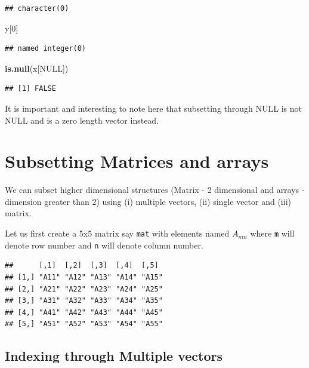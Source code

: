 \documentclass[
]{book}
\newenvironment{Shaded}{\begin{snugshade}}{\end{snugshade}}
\newcommand{\ConstantTok}[1]{\textcolor[rgb]{0.56,0.35,0.01}{#1}}
\newcommand{\DecValTok}[1]{\textcolor[rgb]{0.00,0.00,0.81}{#1}}
\newcommand{\FunctionTok}[1]{\textcolor[rgb]{0.13,0.29,0.53}{\textbf{#1}}}
\newcommand{\NormalTok}[1]{#1}
\begin{document}
\begin{verbatim}
## character(0)
\end{verbatim}

\begin{Shaded}
\begin{Highlighting}[]
\NormalTok{y[}\DecValTok{0}\NormalTok{]}
\end{Highlighting}
\end{Shaded}

\begin{verbatim}
## named integer(0)
\end{verbatim}

\begin{Shaded}
\begin{Highlighting}[]
\FunctionTok{is.null}\NormalTok{(x[}\ConstantTok{NULL}\NormalTok{])}
\end{Highlighting}
\end{Shaded}

\begin{verbatim}
## [1] FALSE
\end{verbatim}

It is important and interesting to note here that subsetting through NULL is not NULL and is a zero length vector instead.

\hypertarget{subsetting-matrices-and-arrays}{%
\section{Subsetting Matrices and arrays}\label{subsetting-matrices-and-arrays}}

We can subset higher dimensional structures (Matrix - 2 dimensional and arrays - dimension greater than 2) using (i) multiple vectors, (ii) single vector and (iii) matrix.

Let us first create a 5x5 matrix say \texttt{mat} with elements named \(A_{mn}\) where \texttt{m} will denote row number and \texttt{n} will denote column number.

\begin{verbatim}
##      [,1]  [,2]  [,3]  [,4]  [,5] 
## [1,] "A11" "A12" "A13" "A14" "A15"
## [2,] "A21" "A22" "A23" "A24" "A25"
## [3,] "A31" "A32" "A33" "A34" "A35"
## [4,] "A41" "A42" "A43" "A44" "A45"
## [5,] "A51" "A52" "A53" "A54" "A55"
\end{verbatim}

\hypertarget{indexing-through-multiple-vectors}{%
\subsection{Indexing through Multiple vectors}\label{indexing-through-multiple-vectors}}
\end{document}
